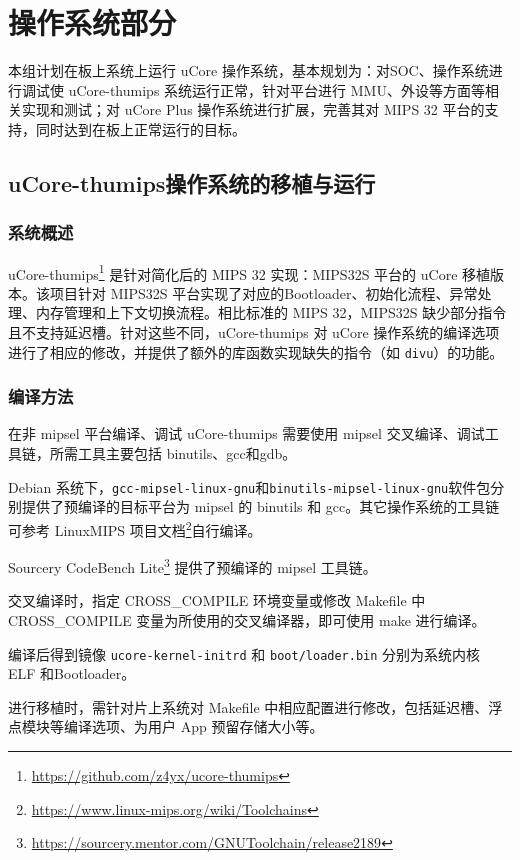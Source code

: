 \chapter{操作系统部分}
本组计划在板上系统上运行 uCore 操作系统，基本规划为：对SOC、操作系统进行调试使 uCore-thumips 系统运行正常，针对平台进行 MMU、外设等方面等相关实现和测试；对 uCore Plus 操作系统进行扩展，完善其对 MIPS 32 平台的支持，同时达到在板上正常运行的目标。

\section{uCore-thumips操作系统的移植与运行}
\label{section:ucore-thumips}
\subsection{系统概述}

uCore-thumips\footnote{\url{https://github.com/z4yx/ucore-thumips}} 是针对简化后的 MIPS 32 实现：MIPS32S 平台的 uCore 移植版本。该项目针对 MIPS32S 平台实现了对应的Bootloader、初始化流程、异常处理、内存管理和上下文切换流程。相比标准的 MIPS 32，MIPS32S 缺少部分指令且不支持延迟槽。针对这些不同，uCore-thumips 对 uCore 操作系统的编译选项进行了相应的修改，并提供了额外的库函数实现缺失的指令（如 \texttt{divu}）的功能。

\subsection{编译方法}
在非 mipsel 平台编译、调试 uCore-thumips 需要使用 mipsel 交叉编译、调试工具链，所需工具主要包括 binutils、gcc和gdb。

Debian 系统下，\texttt{gcc-mipsel-linux-gnu}和\texttt{binutils-mipsel-linux-gnu}软件包分别提供了预编译的目标平台为 mipsel 的 binutils 和 gcc。其它操作系统的工具链可参考 LinuxMIPS 项目文档\footnote{\url{https://www.linux-mips.org/wiki/Toolchains}}自行编译。

Sourcery CodeBench Lite\footnote{\url{https://sourcery.mentor.com/GNUToolchain/release2189}} 提供了预编译的 mipsel 工具链。 

交叉编译时，指定 CROSS\_COMPILE 环境变量或修改 Makefile 中 CROSS\_COMPILE 变量为所使用的交叉编译器，即可使用 make 进行编译。

编译后得到镜像 \texttt{ucore-kernel-initrd} 和 \texttt{boot/loader.bin} 分别为系统内核 ELF 和Bootloader。

进行移植时，需针对片上系统对 Makefile 中相应配置进行修改，包括延迟槽、浮点模块等编译选项、为用户 App 预留存储大小等。


